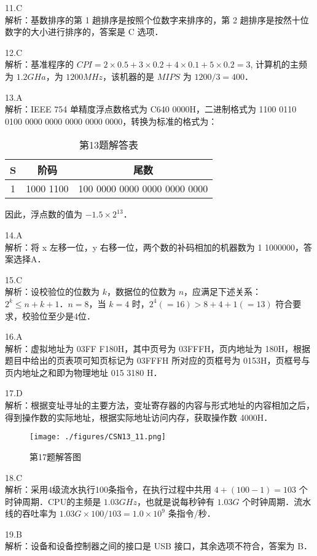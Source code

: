 11.C \\
解析：基数排序的第 1 趟排序是按照个位数字来排序的，第 2 趟排序是按然十位数字的大小进行排序的，答案是 C 选项． 

12.C \\
解析：基准程序的 $CPI=2 \times 0.5 + 3 \times 0.2 + 4 \times 0.1 + 5 \times 0.2 = 3$, 计算机的主频为 $1.2GHa$，为 $1200MHz$，该机器的是 $MIPS$ 为 $1 200/3=400$．

13.A \\
解析：IEEE 754 单精度浮点数格式为 C640 0000H，二进制格式为 1100 0110 0100 0000 0000 0000 0000 0000，转换为标准的格式为： 
\begin{table}[ht]
\centering
\caption{第13题解答表}\label{CSN13_tab7}
\begin{tabular}{|c|c|c|}
\hline
S & 阶码 & 尾数 \\
\hline
1 & 1000 1100 & 100 0000 0000 0000 0000 0000 \\
\hline
\end{tabular}
\end{table}
因此，浮点数的值为 $-1.5 \times 2^{13}$．

14.A \\
解析：将 x 左移一位，y 右移一位，两个数的补码相加的机器数为 1 1000000，答案选择A．

15.C \\
解析：设校验位的位数为 $k$，数据位的位数为 $n$，应满足下述关系：$2^k \leq n+k+1$．$n=8$，当 $k=4$ 时，$2^4(=16)>8+4+1(=13)$ 符合要求，校验位至少是4位．

16.A \\
解析：虚拟地址为 03FF F180H，其中页号为 03FFFH，页内地址为 180H，根据题目中给出的页表项可知页标记为 03FFFH 所对应的页框号为 0153H，页框号与页内地址之和即为物理地址 015 3180 H．

17.D \\
解析：根据变址寻址的主要方法，变址寄存器的内容与形式地址的内容相加之后，得到操作数的实际地址，根据实际地址访问内存，获取操作数 4000H．
\begin{figure}[ht]
\centering
\texttt{[image: ./figures/CSN13\_11.png]}
\caption{第17题解答图} \label{CSN13_fig11}
\end{figure}

18.C \\
解析：采用4级流水执行100条指令，在执行过程中共用 $4+(100-1)=103$ 个时钟周期．CPU的主频是 $1.03GHz$，也就是说每秒钟有 $1.03G$ 个时钟周期．流水线的吞吐率为 $1.03G\times100/103=1.0\times10^9$ 条指令/秒．

19.B \\
解析：设备和设备控制器之间的接口是 USB 接口，其余选项不符合，答案为 B．

